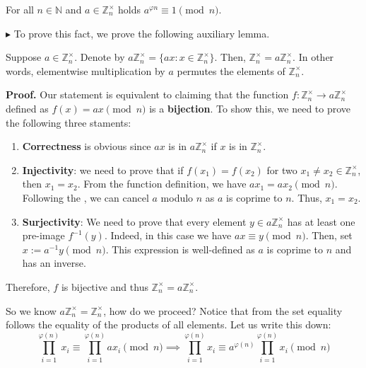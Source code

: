 \documentclass[../lecture-notes.tex]{subfiles}
\begin{document}
\begin{theorem} [Euler's]
    For all $n \in \mathbb{N}$ and $a \in \mathbb{Z}_n^{\times}$ 
    holds $a^{\varphi{n}} \equiv 1 \pmod{n}$.
\end{theorem}

$\blacktriangleright$ To prove this fact, we prove the following auxiliary lemma.

\begin{lemma}
    Suppose $a \in \mathbb{Z}_n^{\times}$. Denote by $a\mathbb{Z}_n^{\times} =
    \{ax: x \in \mathbb{Z}_n^{\times}\}$. Then, $\mathbb{Z}_n^{\times} =
    a\mathbb{Z}_n^{\times}$. In other words, elementwise multiplication by $a$
    permutes the elements of $\mathbb{Z}_n^{\times}$.
\end{lemma}

\textbf{Proof.} Our statement is equivalent to claiming that the 
function $f: \mathbb{Z}_n^{\times} \to a\mathbb{Z}_n^{\times}$ defined 
as $f(x) = ax \pmod{n}$ is a \textbf{bijection}. To show this, we need to prove the following 
three staments:
\begin{enumerate}
    \item \textbf{Correctness} is obvious since $ax$ is in $a\mathbb{Z}_n^{\times}$ if $x$ is in $\mathbb{Z}_n^{\times}$.
    \item \textbf{Injectivity}: we need to prove that if $f(x_1)=f(x_2)$ for two $x_1 \neq x_2 \in \mathbb{Z}_n^{\times}$, then 
    $x_1=x_2$. From the function definition, we have $ax_1=ax_2 \pmod{n}$. Following the , 
    we can cancel $a$ modulo $n$ as $a$ is coprime to $n$. Thus, $x_1=x_2$.
    \item \textbf{Surjectivity}: We need to prove that every element $y \in a\mathbb{Z}_n^{\times}$ has at least 
    one pre-image $f^{-1}(y)$. Indeed, in this case we have $ax \equiv y \pmod{n}$. Then, set $x := a^{-1}y \pmod {n}$. This 
    expression is well-defined as $a$ is coprime to $n$ and has an inverse.
\end{enumerate}

Therefore, $f$ is bijective and thus $\mathbb{Z}_n^{\times} = a\mathbb{Z}_n^{\times}$.

\vspace{10px}

So we know $a\mathbb{Z}_n^{\times} = \mathbb{Z}_n^{\times}$, how do we proceed? Notice that 
from the set equality follows the equality of the products of all elements. Let us write this down:
\begin{equation*}
    \prod_{i = 1}^{\varphi(n)} x_i \equiv \prod_{i = 1}^{\varphi(n)} a x_i \pmod{n} \implies \prod_{i = 1}^{\varphi(n)} x_i \equiv a^{\varphi(n)} \prod_{i = 1}^{\varphi(n)} x_i \pmod{n}
\end{equation*}    
    
\end{document}
